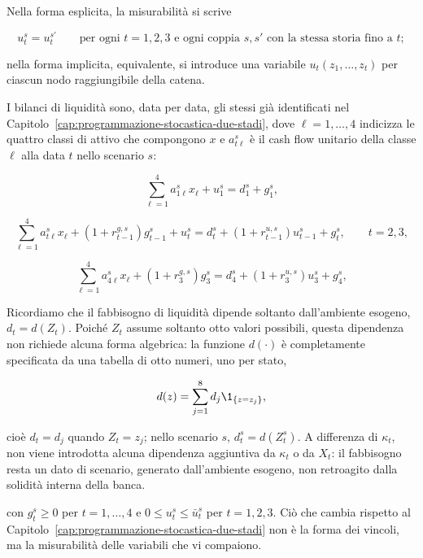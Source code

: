 Nella forma esplicita, la misurabilit\`a si scrive

\[
u_t^s=u_t^{s'}
\qquad
\text{per ogni } t=1,2,3 \text{ e ogni coppia } s,s' \text{ con la stessa
storia fino a } t;
\]

nella forma implicita, equivalente, si introduce una variabile $u_t(z_1,\ldots,z_t)$
per ciascun nodo raggiungibile della catena.

I bilanci di liquidit\`a sono, data per data, gli stessi gi\`a identificati
nel Capitolo~\ref{cap:programmazione-stocastica-due-stadi}, dove $\ell=1,\ldots,4$
indicizza le quattro classi di attivo che compongono $x$ e $a_{t\ell}^s$ \`e
il cash flow unitario della classe $\ell$ alla data $t$ nello scenario $s$:

\begin{equation}
\sum_{\ell=1}^{4}a_{1\ell}^sx_\ell+u_1^s=d_1^s+g_1^s,
\label{eq:cap15-bilancio-t1}
\end{equation}

\begin{equation}
\sum_{\ell=1}^{4}a_{t\ell}^sx_\ell
+(1+r_{t-1}^{g,s})g_{t-1}^s
+u_t^s
=
d_t^s+(1+r_{t-1}^{u,s})u_{t-1}^s+g_t^s,
\qquad t=2,3,
\label{eq:cap15-bilancio-tintermedie}
\end{equation}

\begin{equation}
\sum_{\ell=1}^{4}a_{4\ell}^sx_\ell+(1+r_3^{g,s})g_3^s
=
d_4^s+(1+r_3^{u,s})u_3^s+g_4^s,
\label{eq:cap15-bilancio-t4}
\end{equation}

Ricordiamo che il fabbisogno di liquidit\`a dipende soltanto dall'ambiente esogeno, $d_t=d(Z_t)$. 
Poich\'e $Z_t$ assume soltanto otto valori possibili, questa dipendenza non richiede alcuna forma algebrica: la funzione $d(\cdot)$ \`e completamente specificata da una tabella di otto numeri, uno per stato,

\[
d(z)=\sum_{j=1}^{8}d_j\1_{\{z=z_j\}},
\]

cio\`e $d_t=d_j$ quando $Z_t=z_j$; nello scenario $s$, $d_t^s=d(Z_t^s)$. A
differenza di $\kappa_t$, non viene introdotta alcuna dipendenza aggiuntiva
da $\kappa_t$ o da $X_t$: il fabbisogno resta un dato di scenario, generato
dall'ambiente esogeno, non retroagito dalla solidit\`a interna della banca.

con $g_t^s\geq0$ per $t=1,\ldots,4$ e $0\leq u_t^s\leq\bar u_t^s$ per
$t=1,2,3$. Ci\`o che cambia rispetto al Capitolo~\ref{cap:programmazione-stocastica-due-stadi}
non \`e la forma dei vincoli, ma la misurabilit\`a delle variabili che vi
compaiono.

